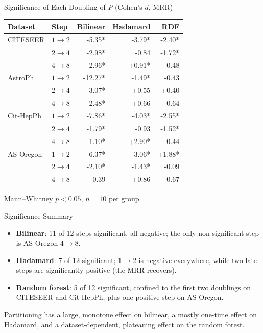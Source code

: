 \documentclass[aspectratio=169]{beamer}
\begin{document}
\begin{frame}{Significance of Each Doubling of $P$ (Cohen's $d$, MRR)}
  \scriptsize
  \begin{tabular}{llrrr}
    \toprule
    Dataset & Step & Bilinear & Hadamard & RDF \\
    \midrule
    CITESEER  & $1 \rightarrow 2$ & -5.35* & -3.79* & -2.40* \\
              & $2 \rightarrow 4$ & -2.98* & -0.84  & -1.72* \\
              & $4 \rightarrow 8$ & -2.96* & +0.91* & -0.48 \\
    \midrule
    AstroPh   & $1 \rightarrow 2$ & -12.27* & -1.49* & -0.43 \\
              & $2 \rightarrow 4$ & -3.07* & +0.55 & +0.40 \\
              & $4 \rightarrow 8$ & -2.48* & +0.66 & -0.64 \\
    \midrule
    Cit-HepPh & $1 \rightarrow 2$ & -7.86* & -4.03* & -2.55* \\
              & $2 \rightarrow 4$ & -1.79* & -0.93 & -1.52* \\
              & $4 \rightarrow 8$ & -1.10* & +2.90* & -0.44 \\
    \midrule
    AS-Oregon & $1 \rightarrow 2$ & -6.37* & -3.06* & +1.88* \\
              & $2 \rightarrow 4$ & -2.10* & -1.43* & -0.09 \\
              & $4 \rightarrow 8$ & -0.39 & +0.86 & -0.67 \\
    \bottomrule
  \end{tabular}

  \footnotesize * Mann--Whitney $p < 0.05$, $n = 10$ per group.
\end{frame}

\begin{frame}{Significance Summary}
  \begin{itemize}
    \item \textbf{Bilinear}: 11 of 12 steps significant, all negative; the only non-significant step is AS-Oregon $4 \rightarrow 8$.
    \item \textbf{Hadamard}: 7 of 12 significant; $1 \rightarrow 2$ is negative everywhere, while two late steps are significantly positive (the MRR recovers).
    \item \textbf{Random forest}: 5 of 12 significant, confined to the first two doublings on CITESEER and Cit-HepPh, plus one positive step on AS-Oregon.
  \end{itemize}
  \vspace{0.5em}
  Partitioning has a large, monotone effect on bilinear, a mostly one-time effect on Hadamard, and a dataset-dependent, plateauing effect on the random forest.
\end{frame}
\end{document}
